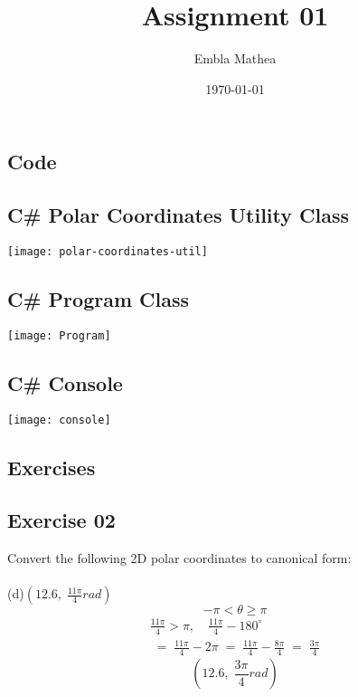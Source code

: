 \documentclass[12pt, a4paper]{article}
\title{Assignment 01}
\author{Embla Mathea}
\date{\today}
\begin{document}
\maketitle

\begin{center}
	\section*{Code}
\end{center}

\subsection*{C\# Polar Coordinates Utility Class}
	\begin{center}
		\texttt{[image: polar-coordinates-util]}
	\end{center}

\newpage\quad

\subsection*{C\# Program Class}
	\begin{center}
		\texttt{[image: Program]}
	\end{center}
	
\subsection*{C\# Console}
	\begin{center}
		\texttt{[image: console]}
	\end{center}

\newpage\quad

\begin{center}
	\section*{Exercises}
\end{center}

\subsection*{Exercise 02}
Convert the following 2D polar coordinates to
canonical form:\\\\		
	(d)\quad $\left(12.6,\;\frac{11\pi}{4}rad\right)$
		\begin{equation}
			\tag*{}
			-\pi<\theta\geq\pi
		\end{equation}
		\begin{gather}
			\tag*{}
				\frac{11\pi}{4}>\pi,\quad
				\frac{11\pi}{4}-180^\circ\\
			\tag*{}
				\;=\;\frac{11\pi}{4}-2\pi\;=\;
				\frac{11\pi}{4}-\frac{8\pi}{4}\;=\;
				\frac{3\pi}{4}
		\end{gather}
		\begin{equation}
			\tag{Canonical form}
				\left(12.6,\;\frac{3\pi}{4}rad\right)
		\end{equation}
\end{document}
